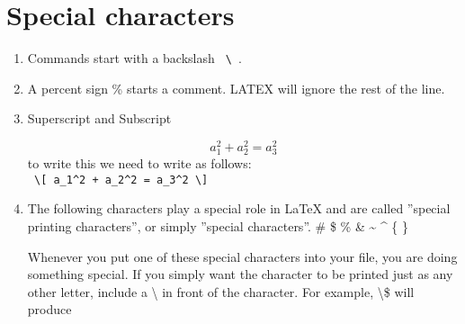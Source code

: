 \documentclass{article}
\begin{document}
\section{Special characters}
\begin{enumerate}
  \item Commands start with a backslash \verb | \ |.
  \item A percent sign \% starts a comment. LATEX will ignore the rest of the line.
  \item Superscript and Subscript

  \[ a_1^2 + a_2^2 = a_3^2 \]
  to write this we need to write as follows: \\
  \verb | \[ a_1^2 + a_2^2 = a_3^2 \] |
  

  \item The following characters play a special role in LaTeX and are called ”special printing characters”, or simply ”special characters”.
  \# \$ \% \& \~{} \^{} \{ \} 

  Whenever you put one of these special characters into your file, you are doing something special. If you simply want the character to be printed just as any other letter, include a \textbackslash{} in front of the character. For example, \textbackslash\$ will produce
\end{enumerate}
\end{document}
